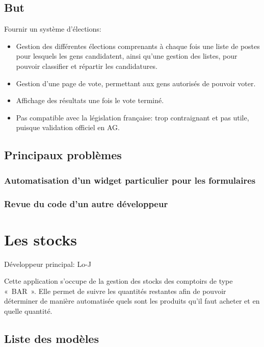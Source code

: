 \documentclass[a4paper]{report}
\begin{document}
\section{But}
\label{sub:but}
\par Fournir un système d'élections:
\begin{itemize}
    \item Gestion des différentes élections comprenants à chaque fois une liste de postes pour lesquels les gens
        candidatent, ainsi qu'une gestion des listes, pour pouvoir classifier et répartir les candidatures.
    \item Gestion d'une page de vote, permettant aux gens autorisés de pouvoir voter.
    \item Affichage des résultats une fois le vote terminé.
    \item Pas compatible avec la législation française: trop contraignant et pas utile, puisque validation officiel en
        AG.
\end{itemize}

\section{Principaux problèmes}
\label{sec:principaux_problemes}

\subsection{Automatisation d'un widget particulier pour les formulaires}
\label{sub:automatisation_d_un_widget_particulier_pour_les_formulaires}

\subsection{Revue du code d'un autre développeur}
\label{sub:revue_du_code_d_un_autre_developpeur}


\chapter{Les stocks}
\label{sub:les_stocks}
\par Développeur principal: Lo-J
\par Cette application s’occupe de la gestion des stocks des comptoirs de type « BAR ». Elle permet de suivre les quantités restantes afin de pouvoir déterminer de manière automatisée quels sont les produits qu’il faut acheter et en quelle quantité.

\section{Liste des modèles}
\label{sec:liste_des_modeles}
\end{document}
